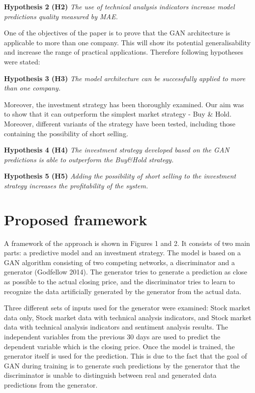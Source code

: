 \documentclass[11pt]{article} %
\begin{document}
\textbf{Hypothesis 2 (H2)} \textit{The use of technical analysis indicators increase model predictions quality measured by MAE.}

One of the objectives of the paper is to prove that the GAN architecture is applicable to more than one company. This will show its potential generalisability and increase the range of practical applications. Therefore following hypotheses were stated:

\textbf{Hypothesis 3 (H3)} \textit{The model architecture can be successfully applied to more than one company.}

Moreover, the investment strategy has been thoroughly examined. Our aim was to show that it can outperform the simplest market strategy - Buy \& Hold. Moreover, different variants of the strategy have been tested, including those containing the possibility of short selling. 

\textbf{Hypothesis 4 (H4)} \textit{The investment strategy developed based on the GAN predictions is able to outperform the Buy\&Hold strategy.} 

\textbf{Hypothesis 5 (H5)} \textit{Adding the possibility of short selling to the investment strategy increases the profitability of the system.}


\section{Proposed framework}
A framework of the approach is shown in Figures 1 and 2. It consists of two main parts: a predictive model and an investment strategy. The model is based on a GAN algorithm consisting of two competing networks, a discriminator and a generator (Godfellow 2014). The generator tries to generate a prediction as close as possible to the actual closing price, and the discriminator tries to learn to recognize the data artificially generated by the generator from the actual data. 

Three different sets of inputs used for the generator were examined: Stock market data only, Stock market data with technical analysis indicators, and Stock market data with technical analysis indicators and sentiment analysis results. The independent variables from the previous 30 days are used to predict the dependent variable which is the closing price. Once the model is trained, the generator itself is used for the prediction. This is due to the fact that the goal of GAN during training is to generate such predictions by the generator that the discriminator is unable to distinguish between real and generated data predictions from the generator.
\end{document}

